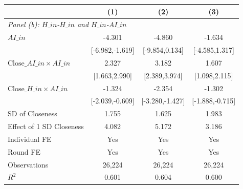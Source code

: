 \begin{table}[H]
\begin{threeparttable}
\begin{tabular}{l*{3}{c}}
\midrule
& (1) & (2) & (3) \\
\midrule
\multicolumn{4}{l}{\textit{Panel (b): $H\_{in}$-$H\_{in}$ and $H\_{in}$-$AI\_{in}$}} \\
\midrule
$AI\_{in}$   &                -4.301\sym{**} &                -4.860         &                -1.634         \\
            &       [-6.982,-1.619]         &        [-9.854,0.134]         &        [-4.585,1.317]         \\
\addlinespace
$\text{Close}\_{AI\_{in}} \times AI\_{in}$&                 2.327\sym{***}&                 3.182\sym{***}&                 1.607\sym{***}\\
            &         [1.663,2.990]         &         [2.389,3.974]         &         [1.098,2.115]         \\
\addlinespace
$\text{Close}\_{H\_{in}} \times AI\_{in}$&                -1.324\sym{***}&                -2.354\sym{***}&                -1.302\sym{***}\\
            &       [-2.039,-0.609]         &       [-3.280,-1.427]         &       [-1.888,-0.715]         \\
\midrule
SD of Closeness&                 1.755         &                 1.625         &                 1.983         \\
Effect of 1 SD Closeness&                 4.082         &                 5.172         &                 3.186         \\
Individual FE&                   Yes         &                   Yes         &                   Yes         \\
Round FE    &                   Yes         &                   Yes         &                   Yes         \\
Observations&                26,224         &                26,224         &                26,224         \\
\(R^2\)     &                 0.601         &                 0.604         &                 0.600         \\


\end{tabular}
\end{threeparttable}
\end{table}
